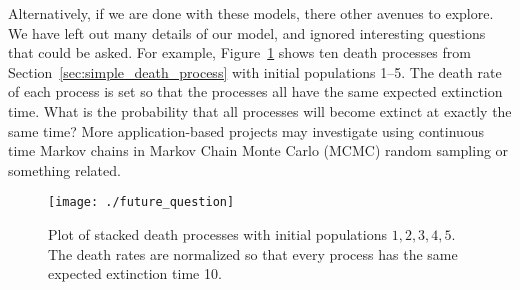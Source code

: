 \documentclass[12pt]{article}
\theoremstyle{definition}
\begin{document}
Alternatively, if we are done with these models, there other avenues to
explore. We have left out many details of our model, and ignored interesting
questions that could be asked. For example, Figure~\ref{fig:stacked-death}
shows ten death processes from Section~\ref{sec:simple_death_process} with
initial populations 1--5. The death rate of each process is set so that the
processes all have the same expected extinction time. What is the probability
that all processes will become extinct at exactly the same time? More
application-based projects may investigate using continuous time Markov chains
in Markov Chain Monte Carlo (MCMC) random sampling or something related.

\begin{figure}[b]
    \centering
    \texttt{[image: ./future\_question]}
    \caption{Plot of stacked death processes with initial populations $1, 2, 3,
    4, 5$. The death rates are normalized so that every process has the same
    expected extinction time 10.}
    \label{fig:stacked-death}
\end{figure}

\clearpage


\end{document}
